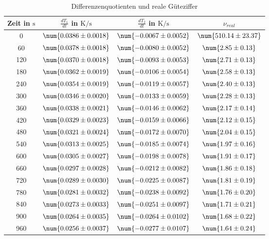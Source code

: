 \begin{table}
 \centering
 \begin{tabular}{S S S S }
 \toprule
{Zeit in $\si{\second}$} & {$\frac{dT_1}{dt}$ in $\si{\kelvin \per \second}$} & {$\frac{dT_2}{dt}$ in $\si{\kelvin \per \second}$} & {$\nu_{real}$} \\
 & $\num{ 0.0386 \pm 0.0018 }$ & $\num{ -0.0067 \pm 0.0052 }$ & $\num{ 510.14 \pm 23.37 }$ \\
60 & $\num{ 0.0378 \pm 0.0018 }$ & $\num{ -0.0080 \pm 0.0052 }$ & $\num{ 2.85 \pm 0.13 }$ \\
120 & $\num{ 0.0370 \pm 0.0018 }$ & $\num{ -0.0093 \pm 0.0053 }$ & $\num{ 2.71 \pm 0.13 }$ \\
180 & $\num{ 0.0362 \pm 0.0019 }$ & $\num{ -0.0106 \pm 0.0054 }$ & $\num{ 2.58 \pm 0.13 }$ \\
240 & $\num{ 0.0354 \pm 0.0019 }$ & $\num{ -0.0119 \pm 0.0057 }$ & $\num{ 2.40 \pm 0.13 }$ \\
300 & $\num{ 0.0346 \pm 0.0020 }$ & $\num{ -0.0133 \pm 0.0059 }$ & $\num{ 2.28 \pm 0.13 }$ \\
360 & $\num{ 0.0338 \pm 0.0021 }$ & $\num{ -0.0146 \pm 0.0062 }$ & $\num{ 2.17 \pm 0.14 }$ \\
420 & $\num{ 0.0329 \pm 0.0023 }$ & $\num{ -0.0159 \pm 0.0066 }$ & $\num{ 2.12 \pm 0.15 }$ \\
480 & $\num{ 0.0321 \pm 0.0024 }$ & $\num{ -0.0172 \pm 0.0070 }$ & $\num{ 2.04 \pm 0.15 }$ \\
540 & $\num{ 0.0313 \pm 0.0025 }$ & $\num{ -0.0185 \pm 0.0074 }$ & $\num{ 1.97 \pm 0.16 }$ \\
600 & $\num{ 0.0305 \pm 0.0027 }$ & $\num{ -0.0198 \pm 0.0078 }$ & $\num{ 1.91 \pm 0.17 }$ \\
660 & $\num{ 0.0297 \pm 0.0028 }$ & $\num{ -0.0212 \pm 0.0082 }$ & $\num{ 1.86 \pm 0.18 }$ \\
720 & $\num{ 0.0289 \pm 0.0030 }$ & $\num{ -0.0225 \pm 0.0087 }$ & $\num{ 1.81 \pm 0.19 }$ \\
780 & $\num{ 0.0281 \pm 0.0032 }$ & $\num{ -0.0238 \pm 0.0092 }$ & $\num{ 1.76 \pm 0.20 }$ \\
840 & $\num{ 0.0273 \pm 0.0033 }$ & $\num{ -0.0251 \pm 0.0097 }$ & $\num{ 1.71 \pm 0.21 }$ \\
900 & $\num{ 0.0264 \pm 0.0035 }$ & $\num{ -0.0264 \pm 0.0102 }$ & $\num{ 1.68 \pm 0.22 }$ \\
960 & $\num{ 0.0256 \pm 0.0037 }$ & $\num{ -0.0277 \pm 0.0107 }$ & $\num{ 1.64 \pm 0.24 }$ \\
\bottomrule
 \end{tabular}
 \caption{Differenzenquotienten und reale Güteziffer}
 \label{tab: dTdt}
  \end{table}
